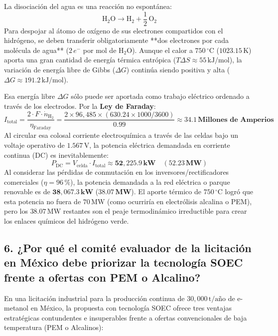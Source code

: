 \documentclass[11pt,a4paper]{article}
\begin{document}
La disociación del agua es una reacción no espontánea:
\begin{equation}
    \text{H}_2\text{O} \longrightarrow \text{H}_2 + \frac{1}{2}\,\text{O}_2
\end{equation}
Para despojar al átomo de oxígeno de sus electrones compartidos con el hidrógeno, se deben transferir obligatoriamente **dos electrones por cada molécula de agua** ($2\,e^-$ por mol de $\text{H}_2\text{O}$). Aunque el calor a $750\,^\circ\text{C}$ ($1023.15\,\text{K}$) aporta una gran cantidad de energía térmica entrópica ($T\Delta S \approx 55\,\text{kJ/mol}$), la variación de energía libre de Gibbs ($\Delta G$) continúa siendo positiva y alta ($\Delta G \approx 191.2\,\text{kJ/mol}$).

Esa energía libre $\Delta G$ sólo puede ser aportada como trabajo eléctrico ordenado a través de los electrodos. Por la \textbf{Ley de Faraday}:
\begin{equation}
    I_{\text{total}} = \frac{2 \cdot F \cdot \dot{n}_{\text{H}_2}}{\eta_{\text{Faraday}}} = \frac{2 \times 96{,}485 \times (630.24 \times 1000 / 3600)}{0.99} \approx \mathbf{34.1\,\text{Millones de Amperios}}
\end{equation}
Al circular esa colosal corriente electroquímica a través de las celdas bajo un voltaje operativo de $1.567\,\text{V}$, la potencia eléctrica demandada en corriente continua (DC) es inevitablemente:
\begin{equation}
    P_{\text{DC}} = V_{\text{celda}} \cdot I_{\text{total}} \approx \mathbf{52{,}225.9\,\text{kW}} \quad (\mathbf{52.23\,\text{MW}})
\end{equation}
Al considerar las pérdidas de conmutación en los inversores/rectificadores comerciales ($\eta = 96\,\%$), la potencia demandada a la red eléctrica o parque renovable es de $\mathbf{38{,}067.3\,\text{kW}}$ ($\mathbf{38.07\,\text{MW}}$). El aporte térmico de $750\,^\circ\text{C}$ logró que esta potencia no fuera de $70\,\text{MW}$ (como ocurriría en electrólisis alcalina o PEM), pero los $38.07\,\text{MW}$ restantes son el peaje termodinámico irreductible para crear los enlaces químicos del hidrógeno verde.

\subsection{6. ¿Por qué el comité evaluador de la licitación en México debe priorizar la tecnología SOEC frente a ofertas con PEM o Alcalino?}
En una licitación industrial para la producción continua de $30{,}000\,\text{t/año}$ de e-metanol en México, la propuesta con tecnología SOEC ofrece tres ventajas estratégicas contundentes e insuperables frente a ofertas convencionales de baja temperatura (PEM o Alcalinos):
\end{document}
